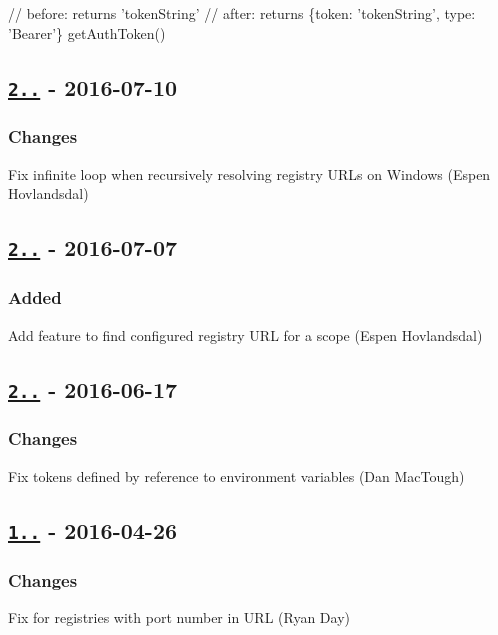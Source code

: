 \begin{DoxyCode}
// before: returns 'tokenString'
// after: returns \{token: 'tokenString', type: 'Bearer'\}
getAuthToken()
\end{DoxyCode}


\subsection*{\href{https://github.com/rexxars/registry-auth-token/compare/v2.1.0...v2.1.1}{\tt 2..} -\/ 2016-\/07-\/10}

\subsubsection*{Changes}


\begin{DoxyItemize}
\item Fix infinite loop when recursively resolving registry U\+R\+Ls on Windows (Espen Hovlandsdal)
\end{DoxyItemize}

\subsection*{\href{https://github.com/rexxars/registry-auth-token/compare/v2.0.0...v2.1.0}{\tt 2..} -\/ 2016-\/07-\/07}

\subsubsection*{Added}


\begin{DoxyItemize}
\item Add feature to find configured registry U\+RL for a scope (Espen Hovlandsdal)
\end{DoxyItemize}

\subsection*{\href{https://github.com/rexxars/registry-auth-token/compare/v1.1.1...v2.0.0}{\tt 2..} -\/ 2016-\/06-\/17}

\subsubsection*{Changes}


\begin{DoxyItemize}
\item Fix tokens defined by reference to environment variables (Dan Mac\+Tough)
\end{DoxyItemize}

\subsection*{\href{https://github.com/rexxars/registry-auth-token/compare/a5b4fe2f5ff982110eb8a813ba1b3b3c5d851af1...v1.1.1}{\tt 1..} -\/ 2016-\/04-\/26}

\subsubsection*{Changes}


\begin{DoxyItemize}
\item Fix for registries with port number in U\+RL (Ryan Day) 
\end{DoxyItemize}